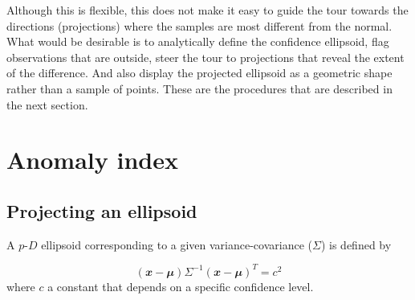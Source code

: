 \documentclass[
  12pt,
]{interact}
\newcommand\pD{$p\text{-}D$}
\begin{document}
Although this is flexible, this does not make it easy to guide the tour
towards the directions (projections) where the samples are most
different from the normal. What would be desirable is to analytically
define the confidence ellipsoid, flag observations that are outside,
steer the tour to projections that reveal the extent of the difference.
And also display the projected ellipsoid as a geometric shape rather
than a sample of points. These are the procedures that are described in
the next section.

\section{Anomaly index}\label{sec-anomaly-index}

\subsection{Projecting an ellipsoid}\label{projecting-an-ellipsoid}

A \pD{} ellipsoid corresponding to a given variance-covariance
(\(\Sigma\)) is defined by

\[
(\mathbfit{x}-\mathbfit{\mu}) \Sigma^{-1}(\mathbfit{x}-\mathbfit{\mu})^T = c^2
\] where \(c\) a constant that depends on a specific confidence level.
\end{document}
